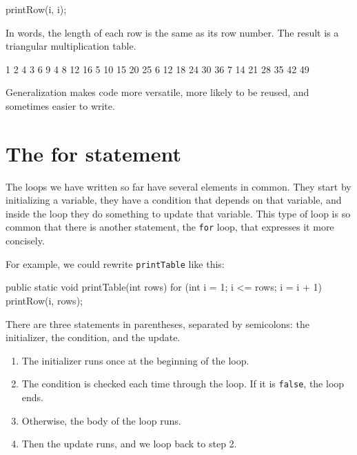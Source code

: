 \documentclass[12pt]{book}
\theoremstyle{exercise}
\newcommand{\java}[1]{\verb"#1"}
\begin{document}
\begin{code}
      printRow(i, i);
\end{code}

In words, the length of each row is the same as its row number.
The result is a triangular multiplication table.

\begin{stdout}
   1
   2   4
   3   6   9
   4   8  12  16
   5  10  15  20  25
   6  12  18  24  30  36
   7  14  21  28  35  42  49
\end{stdout}

Generalization makes code more versatile, more likely to be reused, and sometimes easier to write.




\section{The for statement}
\label{for}


The loops we have written so far have several elements in common.
They start by initializing a variable, they have a condition that depends on that variable, and inside the loop they do something to update that variable.
This type of loop is so common that there is another statement, the \java{for} loop, that expresses it more concisely.

For example, we could rewrite \java{printTable} like this:

\begin{code}
    public static void printTable(int rows) {
        for (int i = 1; i <= rows; i = i + 1) {
            printRow(i, rows);
        }
    }
\end{code}

There are three statements in parentheses, separated by semicolons: the initializer, the condition, and the update.

\begin{enumerate}

\item The initializer runs once at the beginning of the loop.

\item The condition is checked each time through the loop.
If it is \java{false}, the loop ends.

\item Otherwise, the body of the loop runs.

\item Then the update runs, and we loop back to step 2.

\end{enumerate}
\end{document}
